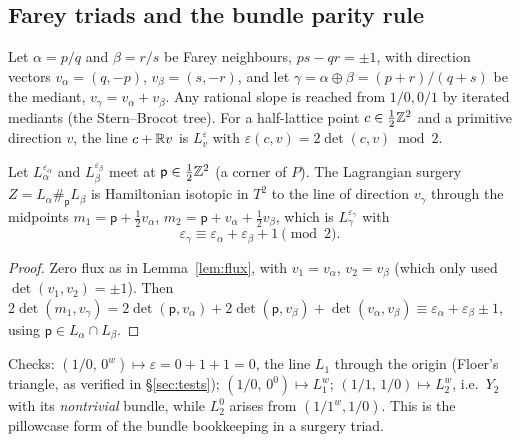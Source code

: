 \subsection{Farey triads and the bundle parity rule}
Let $\alpha=p/q$ and $\beta=r/s$ be Farey neighbours, $ps-qr=\pm1$, with direction vectors $v_\alpha=(q,-p)$,
$v_\beta=(s,-r)$, and let $\gamma=\alpha\oplus\beta=(p+r)/(q+s)$ be the mediant, $v_\gamma=v_\alpha+v_\beta$.  Any
rational slope is reached from $1/0,0/1$ by iterated mediants (the Stern--Brocot tree).  For a half-lattice point
$c\in\tfrac12\mathbb{Z}^2$ and a primitive direction $v$, the line $c+\mathbb{R} v$ is $L^{\varepsilon}_v$ with
$\varepsilon(c,v)=2\det(c,v)\bmod2$.

\begin{lemma}\label{lem:parity}
Let $L^{\varepsilon_\alpha}_\alpha$ and $L^{\varepsilon_\beta}_\beta$ meet at $\mathsf p\in\tfrac12\mathbb{Z}^2$ (a corner of $P$).  The
Lagrangian surgery $Z=L_\alpha\#_{\mathsf p}L_\beta$ is Hamiltonian isotopic in $T^2$ to the line of direction $v_\gamma$
through the midpoints $m_1=\mathsf p+\tfrac12v_\alpha$, $m_2=\mathsf p+v_\alpha+\tfrac12v_\beta$, which is $L^{\varepsilon_\gamma}_\gamma$ with
\[
\varepsilon_\gamma\equiv\varepsilon_\alpha+\varepsilon_\beta+1\pmod 2 .
\]
\end{lemma}
\begin{proof}
Zero flux as in Lemma~\ref{lem:flux}, with $v_1=v_\alpha$, $v_2=v_\beta$ (which only used $\det(v_1,v_2)=\pm1$).
Then $2\det(m_1,v_\gamma)=2\det(\mathsf p,v_\alpha)+2\det(\mathsf p,v_\beta)+\det(v_\alpha,v_\beta)\equiv\varepsilon_\alpha+\varepsilon_\beta\pm1$,
using $\mathsf p\in L_\alpha\cap L_\beta$.
\end{proof}
Checks: $(1/0,\,0^w)\mapsto\varepsilon=0+1+1=0$, the line $L_1$ through the origin (Floer's triangle, as verified in
\S\ref{sec:tests}); $(1/0,\,0^0)\mapsto L^w_1$; $(1/1,\,1/0)\mapsto L^w_{2}$, i.e.\ $Y_2$ with its \emph{nontrivial}
bundle, while $L^0_2$ arises from $(1/1^{w},1/0)$.  This is the pillowcase form of the bundle bookkeeping in a
surgery triad.


